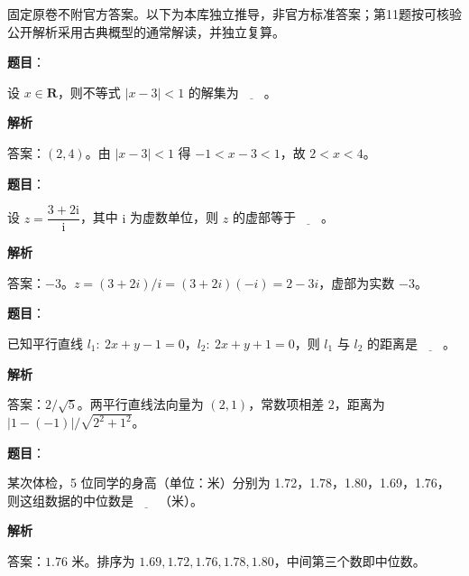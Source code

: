 

\begin{gktip}
固定原卷不附官方答案。以下为本库独立推导，非官方标准答案；第11题按可核验公开解析采用古典概型的通常解读，并独立复算。
\end{gktip}

\begin{answer}

\textbf{题目}：

设 \(x\in\mathbf R\)，则不等式 \(|x-3|<1\) 的解集为\(\underline{\qquad}\)。

\textbf{解析}

答案：\((2,4)\)。由 \(|x-3|<1\) 得 \(-1<x-3<1\)，故 \(2<x<4\)。


\end{answer}
\begin{answer}

\textbf{题目}：

设 \(z=\dfrac{3+2\mathrm i}{\mathrm i}\)，其中 \(\mathrm i\) 为虚数单位，则 \(z\) 的虚部等于\(\underline{\qquad}\)。

\textbf{解析}

答案：\(-3\)。\(z=(3+2i)/i=(3+2i)(-i)=2-3i\)，虚部为实数 \(-3\)。


\end{answer}
\begin{answer}

\textbf{题目}：

已知平行直线 \(l_1:\ 2x+y-1=0\)，\(l_2:\ 2x+y+1=0\)，则 \(l_1\) 与 \(l_2\) 的距离是\(\underline{\qquad}\)。

\textbf{解析}

答案：\(2/\sqrt5\)。两平行直线法向量为 \((2,1)\)，常数项相差 \(2\)，距离为 \(|1-(-1)|/\sqrt{2^2+1^2}\)。


\end{answer}
\begin{answer}

\textbf{题目}：

某次体检，5 位同学的身高（单位：米）分别为 1.72，1.78，1.80，1.69，1.76，则这组数据的中位数是\(\underline{\qquad}\)（米）。

\textbf{解析}

答案：\(1.76\) 米。排序为 \(1.69,1.72,1.76,1.78,1.80\)，中间第三个数即中位数。


\end{answer}
